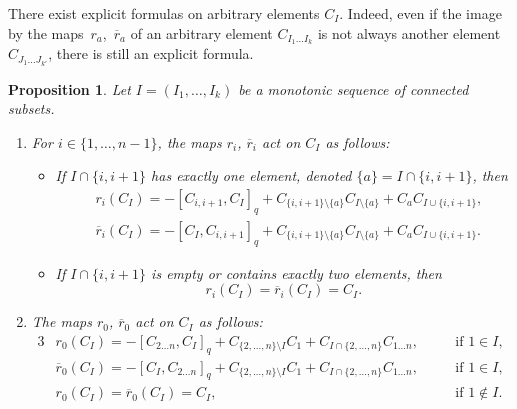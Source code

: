 \documentclass[pdftex]{sigma}
\numberwithin{equation}{section}
\newtheorem{prop}[theo]{Proposition}
\theoremstyle{definition}
\newcommand{\rb}{\overline{r}}
\begin{document}
There exist explicit formulas on arbitrary elements $C_I$. Indeed, even if the image by the maps~$r_a$,~$\rb_a$ of an arbitrary element $C_{I_1\dots I_k}$ is not always another element $C_{J_1\dots J_{k'}}$, there is still an explicit formula.
\begin{prop}\label{prop-ri}
Let $I=(I_1,\dots,I_k)$ be a monotonic sequence of connected subsets.

\begin{enumerate}\itemsep=0pt
\item[$1.$] For $i\in\{1,\dots,n-1\}$, the maps $r_i$, $\rb_i$ act on $C_{I}$ as follows:
\begin{itemize}\itemsep=0pt
 \item If $I\cap\{i,i+1\}$ has exactly one element, denoted $\{a\}=I\cap\{i,i+1\}$, then
\begin{align}\label{def-ri}
&r_i(C_I)=-[C_{i,i+1},C_{I}]_q+C_{ \{i,i+1\}\setminus\{a\} }C_{I\setminus \{a\}}+C_{a}C_{I\cup\{i,i+1\}} ,
\\
\label{def-rbi}
&\rb_i(C_I)= -[C_{I},C_{i,i+1}]_q+C_{ \{i,i+1\}\setminus\{a\} }C_{I\setminus \{a\}}+C_{a}C_{I\cup\{i,i+1\}} .
\end{align}
\item
If $I\cap\{i,i+1\}$ is empty or contains exactly two elements, then \begin{equation} r_i(C_I)=\rb_i(C_I)=C_I. \label{def-rrbi}\end{equation}
\end{itemize}
\item[$2.$] The maps $r_0$, $\rb_0$ act on $C_{I}$ as follows:
\begin{alignat}{3}
& r_0(C_I)=-[C_{2\dots n},C_{I}]_q+C_{ \{2,\dots,n\}\setminus I }C_{1}+C_{I\cap\{2,\dots,n\}}C_{1\dots n} , \quad && \text{if $1\in I$,} & \nonumber\\
& \rb_0(C_I)= -[C_{I},C_{2\dots n}]_q+C_{ \{2,\dots,n\}\setminus I }C_{1}+C_{I\cap\{2,\dots,n\}}C_{1\dots n} , && \text{if $1\in I$,} & \nonumber\\
& r_0(C_I)=\rb_0(C_I)=C_I , && \text{if $1\notin I$.} &\label{def-r0}
\end{alignat}
\end{enumerate}
\end{prop}
\end{document}
